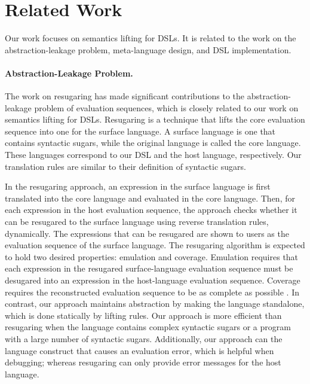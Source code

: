 \section{Related Work}

Our work focuses on semantics lifting for DSLs. It is related to the work on the abstraction-leakage problem, meta-language design, and DSL implementation.

\paragraph{Abstraction-Leakage Problem.}

The work on resugaring \cite{resugar} has made significant contributions to the abstraction-leakage problem of evaluation sequences, which is closely related to our work on semantics lifting for DSLs. Resugaring is a technique that lifts the core evaluation sequence into one for the surface language. A surface language is one that contains syntactic sugars, while the original language is called the core language. These languages correspond to our DSL and the host language, respectively. Our translation rules are similar to their definition of syntactic sugars. 

In the resugaring approach, an expression in the surface language is first translated into the core language and  evaluated in the core language. Then, for each expression in the host evaluation sequence, the approach checks whether it can be resugared to the surface language using reverse translation rules, dynamically. The expressions that can be resugared are shown to users as the evaluation sequence of the surface language. The resugaring algorithm is expected to hold two desired properties: emulation and coverage. Emulation requires that each expression in the resugared surface-language evaluation sequence must be desugared into an expression in the host-language evaluation sequence. Coverage requires the reconstructed evaluation sequence to be as complete as possible . In contrast, our approach maintains abstraction by making the language standalone, which is done statically by lifting  rules. Our approach is more efficient than resugaring when the language contains complex syntactic sugars or a program  with a large number of syntactic sugars. Additionally, our approach can  the language construct that causes an evaluation error, which is helpful when debugging; whereas resugaring can only provide error messages for the host language.

